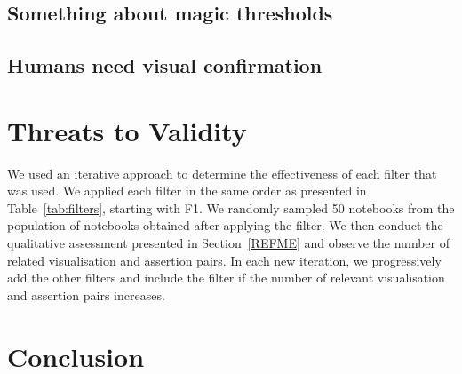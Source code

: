 \documentclass[conference]{IEEEtran}
\begin{document}
\subsection{Something about magic thresholds}\label{sec:magic-threshold}



\subsection{Humans need visual confirmation}\label{sec:visual}



\section{Threats to Validity}\label{sec:threats}


We used an iterative approach to determine the effectiveness of each
filter that was used. We applied each filter in the same order as
presented in Table~\ref{tab:filters}, starting with F1. We randomly
sampled 50 notebooks from the population of notebooks obtained after
applying the filter. We then conduct the qualitative assessment
presented in Section~\ref{REFME} and observe the number of related
visualisation and assertion pairs. In each new iteration, we
progressively add the other filters and include the filter if the
number of relevant visualisation and assertion pairs increases.
\section{Conclusion}\label{sec:conclude}



\end{document}
